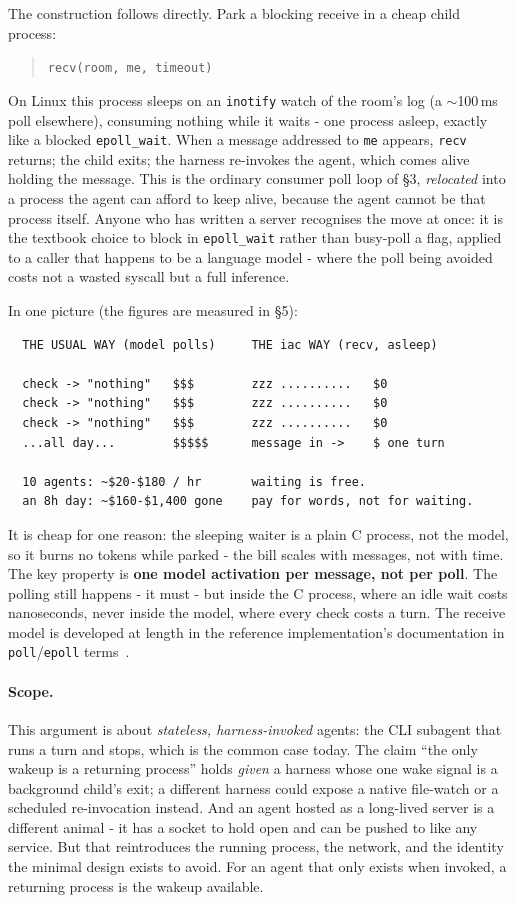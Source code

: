 \documentclass[11pt]{article}
\newcommand{\code}[1]{\texttt{#1}}
\begin{document}
The construction follows directly. Park a blocking receive in a cheap child process:
\begin{quote}
\code{recv(room, me, timeout)}
\end{quote}
On Linux this process sleeps on an \code{inotify} watch of the room's log (a $\sim$100\,ms poll elsewhere), consuming nothing while it waits - one process asleep, exactly like a blocked \code{epoll\_wait}. When a message addressed to \code{me} appears, \code{recv} returns; the child exits; the harness re-invokes the agent, which comes alive holding the message. This is the ordinary consumer poll loop of \S3, \emph{relocated} into a process the agent can afford to keep alive, because the agent cannot be that process itself. Anyone who has written a server recognises the move at once: it is the textbook choice to block in \code{epoll\_wait} rather than busy-poll a flag, applied to a caller that happens to be a language model - where the poll being avoided costs not a wasted syscall but a full inference.

In one picture (the figures are measured in \S5):

\begin{verbatim}
  THE USUAL WAY (model polls)     THE iac WAY (recv, asleep)

  check -> "nothing"   $$$        zzz ..........   $0
  check -> "nothing"   $$$        zzz ..........   $0
  check -> "nothing"   $$$        zzz ..........   $0
  ...all day...        $$$$$      message in ->    $ one turn

  10 agents: ~$20-$180 / hr       waiting is free.
  an 8h day: ~$160-$1,400 gone    pay for words, not for waiting.
\end{verbatim}

It is cheap for one reason: the sleeping waiter is a plain C process, not the model, so it burns no tokens while parked - the bill scales with messages, not with time. The key property is \textbf{one model activation per message, not per poll}. The polling still happens - it must - but inside the C process, where an idle wait costs nanoseconds, never inside the model, where every check costs a turn. The receive model is developed at length in the reference implementation's documentation in \code{poll}/\code{epoll} terms~\cite{receivemodel}.

\paragraph{Scope.} This argument is about \emph{stateless, harness-invoked} agents: the CLI subagent that runs a turn and stops, which is the common case today. The claim ``the only wakeup is a returning process'' holds \emph{given} a harness whose one wake signal is a background child's exit; a different harness could expose a native file-watch or a scheduled re-invocation instead. And an agent hosted as a long-lived server is a different animal - it has a socket to hold open and can be pushed to like any service. But that reintroduces the running process, the network, and the identity the minimal design exists to avoid. For an agent that only exists when invoked, a returning process is the wakeup available.
\end{document}

